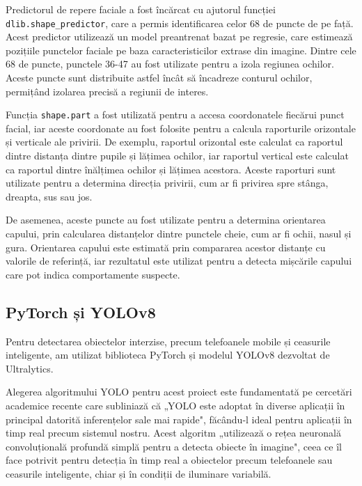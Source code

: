 \documentclass[12pt,a4paper]{article}
\begin{document}
Predictorul de repere faciale a fost încărcat cu ajutorul funcției \texttt{dlib.shape\_predictor}, care a permis identificarea celor 68 de puncte de pe față. Acest predictor utilizează un model preantrenat bazat pe regresie, care estimează pozițiile punctelor faciale pe baza caracteristicilor extrase din imagine. Dintre cele 68 de puncte, punctele 36-47 au fost utilizate pentru a izola regiunea ochilor. Aceste puncte sunt distribuite astfel încât să încadreze conturul ochilor, permițând izolarea precisă a regiunii de interes.

Funcția \texttt{shape.part} a fost utilizată pentru a accesa coordonatele fiecărui punct facial, iar aceste coordonate au fost folosite pentru a calcula raporturile orizontale și verticale ale privirii. De exemplu, raportul orizontal este calculat ca raportul dintre distanța dintre pupile și lățimea ochilor, iar raportul vertical este calculat ca raportul dintre înălțimea ochilor și lățimea acestora. Aceste raporturi sunt utilizate pentru a determina direcția privirii, cum ar fi privirea spre stânga, dreapta, sus sau jos.

De asemenea, aceste puncte au fost utilizate pentru a determina orientarea capului, prin calcularea distanțelor dintre punctele cheie, cum ar fi ochii, nasul și gura. Orientarea capului este estimată prin compararea acestor distanțe cu valorile de referință, iar rezultatul este utilizat pentru a detecta mișcările capului care pot indica comportamente suspecte.

\subsection{PyTorch și YOLOv8}
Pentru detectarea obiectelor interzise, precum telefoanele mobile și ceasurile inteligente, am utilizat biblioteca PyTorch\cite{pytorch} și modelul YOLOv8 dezvoltat de Ultralytics\cite{ultralytics}. 

Alegerea algoritmului YOLO pentru acest proiect este fundamentată pe cercetări academice recente care 
subliniază că „YOLO este adoptat în diverse aplicații în principal datorită inferențelor sale mai 
rapide"\cite{wang2022object}, făcându-l ideal pentru aplicații în timp real precum sistemul nostru. 
Acest algoritm „utilizează o rețea neuronală convoluțională profundă simplă pentru a detecta obiecte 
în imagine"\cite{v7labs2023yolo}, ceea ce îl face potrivit pentru detecția în timp real a obiectelor precum 
telefoanele sau ceasurile inteligente, chiar și în condiții de iluminare variabilă.
\end{document}
